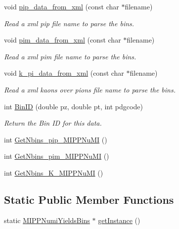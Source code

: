 \begin{DoxyCompactItemize}
\item 
void \hyperlink{class_neutrino_flux_reweight_1_1_m_i_p_p_numi_yields_bins_a05c50ba3849b67cd871c4f1613d53c1a}{pip\-\_\-data\-\_\-from\-\_\-xml} (const char $\ast$filename)
\begin{DoxyCompactList}\small\item\em Read a xml pip file name to parse the bins. \end{DoxyCompactList}\item 
void \hyperlink{class_neutrino_flux_reweight_1_1_m_i_p_p_numi_yields_bins_a4032ced2609fbf5babe8c2d10f8630cc}{pim\-\_\-data\-\_\-from\-\_\-xml} (const char $\ast$filename)
\begin{DoxyCompactList}\small\item\em Read a xml pim file name to parse the bins. \end{DoxyCompactList}\item 
void \hyperlink{class_neutrino_flux_reweight_1_1_m_i_p_p_numi_yields_bins_aad185432f167028162f33fe50b39c534}{k\-\_\-pi\-\_\-data\-\_\-from\-\_\-xml} (const char $\ast$filename)
\begin{DoxyCompactList}\small\item\em Read a xml kaons over pions file name to parse the bins. \end{DoxyCompactList}\item 
int \hyperlink{class_neutrino_flux_reweight_1_1_m_i_p_p_numi_yields_bins_a2353da8099269fa78294386dd5be23f4}{Bin\-I\-D} (double pz, double pt, int pdgcode)
\begin{DoxyCompactList}\small\item\em Return the Bin I\-D for this data. \end{DoxyCompactList}\item 
int \hyperlink{class_neutrino_flux_reweight_1_1_m_i_p_p_numi_yields_bins_aa33ade6e9d1af8fa36ab14429aee3f48}{Get\-Nbins\-\_\-pip\-\_\-\-M\-I\-P\-P\-Nu\-M\-I} ()
\item 
int \hyperlink{class_neutrino_flux_reweight_1_1_m_i_p_p_numi_yields_bins_a6a9993f90a6b4c9963076ec945577131}{Get\-Nbins\-\_\-pim\-\_\-\-M\-I\-P\-P\-Nu\-M\-I} ()
\item 
int \hyperlink{class_neutrino_flux_reweight_1_1_m_i_p_p_numi_yields_bins_a4aabd71b9d87441340360cf009546148}{Get\-Nbins\-\_\-\-K\-\_\-\-M\-I\-P\-P\-Nu\-M\-I} ()
\end{DoxyCompactItemize}
\subsection*{Static Public Member Functions}
\begin{DoxyCompactItemize}
\item 
static \hyperlink{class_neutrino_flux_reweight_1_1_m_i_p_p_numi_yields_bins}{M\-I\-P\-P\-Numi\-Yields\-Bins} $\ast$ \hyperlink{class_neutrino_flux_reweight_1_1_m_i_p_p_numi_yields_bins_a7f44afe90a846812d6eabfafa8f576e4}{get\-Instance} ()
\end{DoxyCompactItemize}

